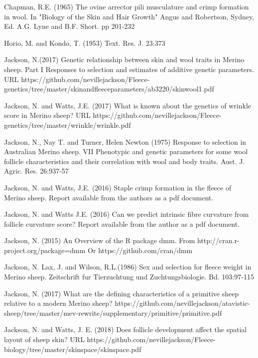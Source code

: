 \documentclass[titlepage]{article}  %
\begin{document}
\begin{thebibliography}{99}

Chapman, R.E. (1965) The ovine arrector pili musculature and crimp formation 
    in wool. In "Biology of the Skin and Hair Growth" Angus and Robertson,
    Sydney, Ed. A.G. Lyne and B.F. Short. pp 201-232

Horio, M. and Kondo, T. (1953) Text. Res. J. 23:373

Jackson, N.(2017) Genetic relationship between skin and wool traits in Merino sheep. Part I Responses to selection and estimates of additive genetic parameters. URL https://github.com/nevillejackson/Fleece-genetics/tree/master/skinandfleeceparameters/ab3220/skinwool1.pdf

Jackson, N. and Watts, J.E. (2017) What is known about the genetics of wrinkle score in Merino sheep? URL https://github.com/nevillejackson/Fleece-genetics/tree/master/wrinkle/wrinkle.pdf

Jackson, N., Nay T. and Turner, Helen Newton (1975) Response to selection
    in Australian Merino sheep. VII Phenotypic and genetic parameters for
    some wool follicle characteristics and their correlation with wool and
    body traits. Aust. J. Agric. Res. 26:937-57

Jackson, N. and Watts, J.E. (2016) Staple crimp formation in the fleece of Merino sheep. 
Report available from the authors as a pdf document.

Jackson, N.  and Watts J.E. (2016) Can we predict intrinsic fibre curvature from follicle curvature score? Report available from the author as a pdf document.

Jackson, N. (2015) An Overview of the R package dmm.
    From http://cran.r-project.org/package=dmm
    Or https://github.com/cran/dmm

Jackson, N. Lax, J. and Wilson, R.L.(1986) Sex and selection for fleece weight in Merino sheep. Zeitschrift fur Tierzuchtung und Zuchtungsbiologie. Bd. 103:97-115

Jackson, N. (2017) What are the defining characteristics of a primitive sheep relative to a modern Merino sheep? https://github.com/nevillejackson/atavistic-sheep/tree/master/mev-rewrite/supplementary/primitive/primitive.pdf

Jackson, N. and Watts, J. E. (2018) Does follicle development affect the spatial layout of sheep skin? URL https://github.com/nevillejackson/Fleece-biology/tree/master/skinspace/skinspace.pdf


\end{thebibliography}
\end{document}
